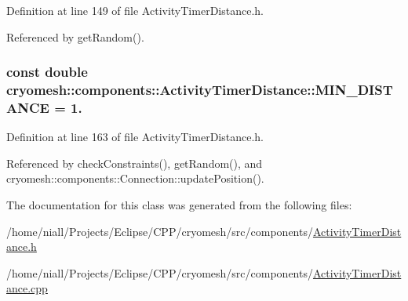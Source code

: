 \-Definition at line 149 of file \-Activity\-Timer\-Distance.\-h.



\-Referenced by get\-Random().

\hypertarget{classcryomesh_1_1components_1_1ActivityTimerDistance_a549f2e016df32a594092179570ae742d}{
\subsubsection[{\-M\-I\-N\-\_\-\-D\-I\-S\-T\-A\-N\-C\-E}]{\setlength{\rightskip}{0pt plus 5cm}const double {\bf cryomesh\-::components\-::\-Activity\-Timer\-Distance\-::\-M\-I\-N\-\_\-\-D\-I\-S\-T\-A\-N\-C\-E} = 1.}}\label{classcryomesh_1_1components_1_1ActivityTimerDistance_a549f2e016df32a594092179570ae742d}


\-Definition at line 163 of file \-Activity\-Timer\-Distance.\-h.



\-Referenced by check\-Constraints(), get\-Random(), and cryomesh\-::components\-::\-Connection\-::update\-Position().



\-The documentation for this class was generated from the following files\-:\begin{DoxyCompactItemize}
\item 
/home/niall/\-Projects/\-Eclipse/\-C\-P\-P/cryomesh/src/components/\hyperlink{ActivityTimerDistance_8h}{\-Activity\-Timer\-Distance.\-h}\item 
/home/niall/\-Projects/\-Eclipse/\-C\-P\-P/cryomesh/src/components/\hyperlink{ActivityTimerDistance_8cpp}{\-Activity\-Timer\-Distance.\-cpp}\end{DoxyCompactItemize}
